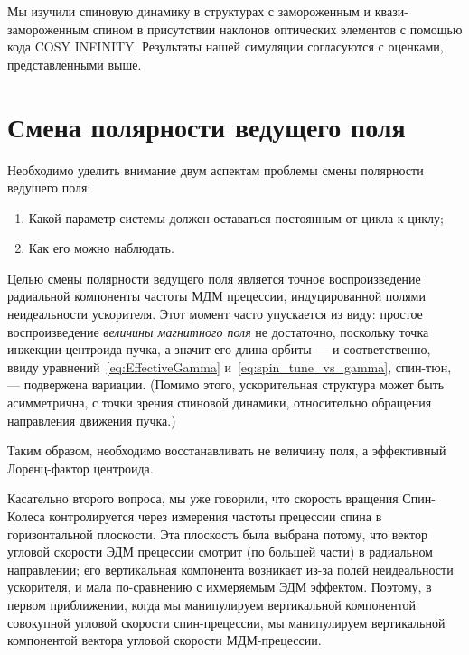 Мы изучили спиновую динамику в структурах с замороженным и
квази-замороженным спином в присутствии наклонов оптических элементов
с помощью кода COSY INFINITY. Результаты нашей симуляции согласуются с оценками,
представленными выше.



\section{Смена полярности ведущего поля}\label{chpt3:GFF}

Необходимо уделить внимание двум аспектам проблемы смены полярности ведушего поля:
\begin{enumerate}
	\item Какой параметр системы должен оставаться постоянным от цикла к циклу;
	\item Как его можно наблюдать.
\end{enumerate}

Целью смены полярности ведущего поля является точное воспроизведение радиальной компоненты
частоты МДМ прецессии, индуцированной полями неидеальности ускорителя. Этот момент часто упускается из виду:
простое воспроизведение \emph{величины магнитного поля} не достаточно, поскольку точка инжекции центроида пучка,
а значит его длина орбиты --- и соответственно, ввиду уравнений~\eqref{eq:EffectiveGamma}
 и~\eqref{eq:spin_tune_vs_gamma}, спин-тюн, --- подвержена вариации. (Помимо этого, ускорительная структура
  может быть асимметрична,	с точки зрения спиновой динамики, относительно обращения 
  направления движения пучка.)

Таким образом, необходимо восстанавливать не величину поля, а эффективный Лоренц-фактор центроида.

Касательно второго вопроса, мы уже говорили, что скорость вращения Спин-Колеса
контролируется через измерения частоты прецессии спина в горизонтальной плоскости. 
Эта плоскость была выбрана потому, что вектор угловой скорости ЭДМ прецессии смотрит
(по большей части) в радиальном направлении; его вертикальная компонента возникает из-за полей
неидеальности ускорителя, и мала по-сравнению с ихмеряемым ЭДМ эффектом.
Поэтому, в первом приближении, когда мы манипулируем вертикальной компонентой совокупной угловой скорости спин-прецессии, мы манипулируем вертикальной компонентой вектора угловой скорости МДМ-прецессии.


